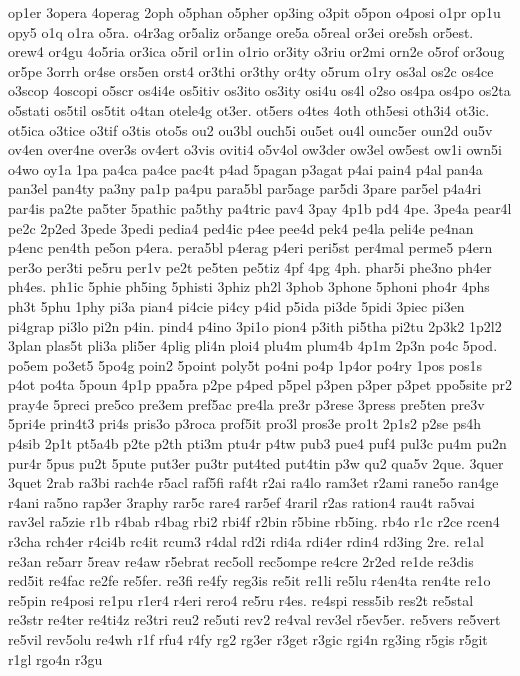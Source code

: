 {op1er
3opera
4operag
2oph
o5phan
o5pher
op3ing
o3pit
o5pon
o4posi
o1pr
op1u
opy5
o1q
o1ra
o5ra.
o4r3ag
or5aliz
or5ange
ore5a
o5real
or3ei
ore5sh
or5est.
orew4
or4gu
4o5ria
or3ica
o5ril
or1in
o1rio
or3ity
o3riu
or2mi
orn2e
o5rof
or3oug
or5pe
3orrh
or4se
ors5en
orst4
or3thi
or3thy
or4ty
o5rum
o1ry
os3al
os2c
os4ce
o3scop
4oscopi
o5scr
os4i4e
os5itiv
os3ito
os3ity
osi4u
os4l
o2so
os4pa
os4po
os2ta
o5stati
os5til
os5tit
o4tan
otele4g
ot3er.
ot5ers
o4tes
4oth
oth5esi
oth3i4
ot3ic.
ot5ica
o3tice
o3tif
o3tis
oto5s
ou2
ou3bl
ouch5i
ou5et
ou4l
ounc5er
oun2d
ou5v
ov4en
over4ne
over3s
ov4ert
o3vis
oviti4
o5v4ol
ow3der
ow3el
ow5est
ow1i
own5i
o4wo
oy1a
1pa
pa4ca
pa4ce
pac4t
p4ad
5pagan
p3agat
p4ai
pain4
p4al
pan4a
pan3el
pan4ty
pa3ny
pa1p
pa4pu
para5bl
par5age
par5di
3pare
par5el
p4a4ri
par4is
pa2te
pa5ter
5pathic
pa5thy
pa4tric
pav4
3pay
4p1b
pd4
4pe.
3pe4a
pear4l
pe2c
2p2ed
3pede
3pedi
pedia4
ped4ic
p4ee
pee4d
pek4
pe4la
peli4e
pe4nan
p4enc
pen4th
pe5on
p4era.
pera5bl
p4erag
p4eri
peri5st
per4mal
perme5
p4ern
per3o
per3ti
pe5ru
per1v
pe2t
pe5ten
pe5tiz
4pf
4pg
4ph.
phar5i
phe3no
ph4er
ph4es.
ph1ic
5phie
ph5ing
5phisti
3phiz
ph2l
3phob
3phone
5phoni
pho4r
4phs
ph3t
5phu
1phy
pi3a
pian4
pi4cie
pi4cy
p4id
p5ida
pi3de
5pidi
3piec
pi3en
pi4grap
pi3lo
pi2n
p4in.
pind4
p4ino
3pi1o
pion4
p3ith
pi5tha
pi2tu
2p3k2
1p2l2
3plan
plas5t
pli3a
pli5er
4plig
pli4n
ploi4
plu4m
plum4b
4p1m
2p3n
po4c
5pod.
po5em
po3et5
5po4g
poin2
5point
poly5t
po4ni
po4p
1p4or
po4ry
1pos
pos1s
p4ot
po4ta
5poun
4p1p
ppa5ra
p2pe
p4ped
p5pel
p3pen
p3per
p3pet
ppo5site
pr2
pray4e
5preci
pre5co
pre3em
pref5ac
pre4la
pre3r
p3rese
3press
pre5ten
pre3v
5pri4e
prin4t3
pri4s
pris3o
p3roca
prof5it
pro3l
pros3e
pro1t
2p1s2
p2se
ps4h
p4sib
2p1t
pt5a4b
p2te
p2th
pti3m
ptu4r
p4tw
pub3
pue4
puf4
pul3c
pu4m
pu2n
pur4r
5pus
pu2t
5pute
put3er
pu3tr
put4ted
put4tin
p3w
qu2
qua5v
2que.
3quer
3quet
2rab
ra3bi
rach4e
r5acl
raf5fi
raf4t
r2ai
ra4lo
ram3et
r2ami
rane5o
ran4ge
r4ani
ra5no
rap3er
3raphy
rar5c
rare4
rar5ef
4raril
r2as
ration4
rau4t
ra5vai
rav3el
ra5zie
r1b
r4bab
r4bag
rbi2
rbi4f
r2bin
r5bine
rb5ing.
rb4o
r1c
r2ce
rcen4
r3cha
rch4er
r4ci4b
rc4it
rcum3
r4dal
rd2i
rdi4a
rdi4er
rdin4
rd3ing
2re.
re1al
re3an
re5arr
5reav
re4aw
r5ebrat
rec5oll
rec5ompe
re4cre
2r2ed
re1de
re3dis
red5it
re4fac
re2fe
re5fer.
re3fi
re4fy
reg3is
re5it
re1li
re5lu
r4en4ta
ren4te
re1o
re5pin
re4posi
re1pu
r1er4
r4eri
rero4
re5ru
r4es.
re4spi
ress5ib
res2t
re5stal
re3str
re4ter
re4ti4z
re3tri
reu2
re5uti
rev2
re4val
rev3el
r5ev5er.
re5vers
re5vert
re5vil
rev5olu
re4wh
r1f
rfu4
r4fy
rg2
rg3er
r3get
r3gic
rgi4n
rg3ing
r5gis
r5git
r1gl
rgo4n
r3gu
}
